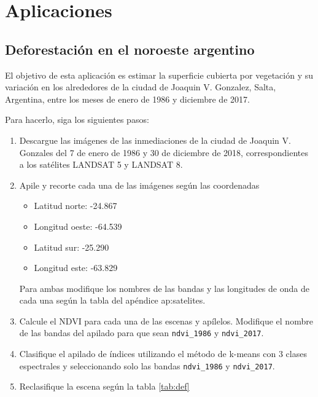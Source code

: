 \chapter{Aplicaciones}

\section{Deforestación en el noroeste argentino}

El objetivo de esta aplicación es estimar la superficie cubierta por vegetación y su variación en los alrededores de la ciudad de Joaquin V. Gonzalez, Salta, Argentina, entre los meses de enero de 1986 y diciembre de 2017.

Para hacerlo, siga los siguientes pasos:

\begin{enumerate}
\item Descargue las imágenes de las inmediaciones de la ciudad de Joaquin V. Gonzales del 7 de enero de 1986 y 30 de diciembre de 2018, correspondientes a los satélites LANDSAT 5 y LANDSAT 8.

\item Apile y recorte cada una de las imágenes según las coordenadas

\begin{itemize}
    \item Latitud norte: -24.867
    \item Longitud oeste: -64.539
    \item Latitud sur: -25.290
    \item Longitud este: -63.829
\end{itemize}

Para ambas modifique los nombres de las bandas y las longitudes de onda de cada una según la tabla del apéndice ap:satelites.

\item Calcule el NDVI para cada una de las escenas y apílelos. Modifique el nombre de las bandas del apilado para que sean \texttt{ndvi\_1986} y \texttt{ndvi\_2017}.

\item Clasifique el apilado de índices utilizando el método de k-means con 3 clases espectrales y seleccionando solo las bandas \texttt{ndvi\_1986} y \texttt{ndvi\_2017}.

\item Reclasifique la escena según la tabla \ref{tab:def}


\end{enumerate}
